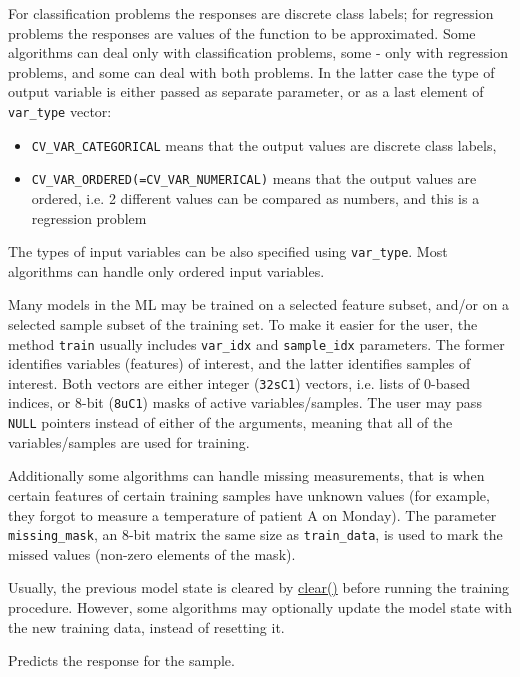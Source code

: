 For classification problems the responses are discrete class labels; for regression problems the responses are values of the function to be approximated. Some algorithms can deal only with classification problems, some - only with regression problems, and some can deal with both problems. In the latter case the type of output variable is either passed as separate parameter, or as a last element of \texttt{var\_type} vector:
\begin{itemize}
 \item \texttt{CV\_VAR\_CATEGORICAL} means that the output values are discrete class labels,
 \item \texttt{CV\_VAR\_ORDERED(=CV\_VAR\_NUMERICAL)} means that the output values are ordered, i.e. 2 different values can be compared as numbers, and this is a regression problem
\end{itemize}
The types of input variables can be also specified using \texttt{var\_type}. Most algorithms can handle only ordered input variables.

Many models in the ML may be trained on a selected feature subset, and/or on a selected sample subset of the training set. To make it easier for the user, the method \texttt{train} usually includes \texttt{var\_idx} and \texttt{sample\_idx} parameters. The former identifies variables (features) of interest, and the latter identifies samples of interest. Both vectors are either integer (\texttt{32sC1}) vectors, i.e. lists of 0-based indices, or 8-bit (\texttt{8uC1}) masks of active variables/samples. The user may pass \texttt{NULL} pointers instead of either of the arguments, meaning that all of the variables/samples are used for training.

Additionally some algorithms can handle missing measurements, that is when certain features of certain training samples have unknown values (for example, they forgot to measure a temperature of patient A on Monday). The parameter \texttt{missing\_mask}, an 8-bit matrix the same size as \texttt{train\_data}, is used to mark the missed values (non-zero elements of the mask).

Usually, the previous model state is cleared by \href{#CvStatModel_clear}{clear()} before running the training procedure. However, some algorithms may optionally update the model state with the new training data, instead of resetting it.



Predicts the response for the sample.

